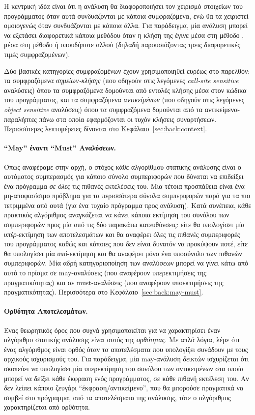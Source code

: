 Η κεντρική ιδέα είναι ότι η ανάλυση θα διαφοροποιήσει τον χειρισμό στοιχείων του προγράμματος όταν αυτά συνδυάζονται με κάποια συμφραζόμενα, ενώ θα τα χειριστεί ομοιογενώς όταν συνδυάζονται με κάποια άλλα. Για παράδειγμα, μία ανάλυση μπορεί να εξετάσει διαφορετικά κάποια μεθόδου όταν η κλήση της έγινε μέσα στη μέθοδο , μέσα στη μέθοδο  ή οπουδήποτε αλλού (δηλαδή παρουσιάζοντας τρεις διαφορετικές τιμές συμφραζομένων).

Δύο βασικές κατηγορίες συμφραζομένων έχουν χρησιμοποιηθεί ευρέως στο παρελθόν: τα συμφραζόμενα \emph{σημείων-κλήσης} (που οδηγούν στις λεγόμενες {\en \emph{call-site sensitive}} αναλύσεις) όπου τα συμφραζόμενα δομούνται από εντολές κλήσης μέσα στον κώδικα του προγράμματος, και τα συμφραζόμενα \emph{αντικείμένων} (που οδηγούν στις λεγόμενες {\en \emph{object sensitive}} αναλύσεις) όπου τα συμφραζόμενα δομούνται από τα αντικείμενα-παραλήπτες πάνω στα οποία εφαρμόζονται οι τυχόν κλήσεις συναρτήσεων. Περισσότερες λεπτομέρειες δίνονται στο Κεφάλαιο~\ref{sec:back:context}.


\paragraph*{``{\en May}'' έναντι ``{\en Must}'' Αναλύσεων.}
Όπως αναφέραμε στην αρχή, ο στόχος κάθε αλγορίθμου στατικής ανάλυσης είναι ο αυτόματος συμπερασμός για κάποιο σύνολο συμπεριφορών που δύναται να επιδείξει ένα πρόγραμμα \emph{σε όλες} τις πιθανές εκτελέσεις του. Μια τέτοια προσπάθεια είναι ένα μη-αποφασίσιμο πρόβλημα για τα περισσότερα σύνολα συμπεριφορών παρά για τα πιο τετριμμένα από αυτά (για ένα τυχαίο πρόγραμμα προς ανάλυση). Κατά συνέπεια, κάθε πρακτικός αλγόριθμος αναγκάζεται να κάνει κάποια εκτίμηση του συνόλου των συμπεριφορών προς μία από τις δύο παρακάτω κατευθύνσεις: είτε θα υπολογίσει μία \emph{υπέρ}-εκτίμηση των αποτελεσμάτων και θα αναφέρει όλες τις πιθανές συμπεριφορές του προγράμματος καθώς και κάποιες που δεν είναι δυνατόν να προκύψουν ποτέ, είτε θα υπολογίσει μία \emph{υπό}-εκτίμηση και θα αναφέρει μόνο ένα υποσύνολο των πιθανών συμπεριφορών. Μία αδρή κατηγοριοποίηση των αναλύσεων μπορεί να γίνει κάτω από αυτό το πρίσμα σε {\en may}-αναλύσεις (που αναφέρουν υπερεκτιμήσεις της πραγματικότητας) και σε {\en must}-αναλύσεις (που αναφέρουν υποεκτιμήσεις της πραγματικότητας). Περισσότερα στο Κεφάλαιο~\ref{sec:back:may-must}.


\paragraph*{Ορθότητα Αποτελεσμάτων.}
Ένας θεωρητικός όρος που συχνά χρησιμοποιείται για να χαρακτηρίσει έναν αλγόριθμο στατικής ανάλυσης είναι αυτός της \emph{ορθότητας}. Με απλά λόγια, λέμε ότι ένας αλγόριθμος είναι ορθός όταν τα αποτελέσματα που υπολογίζει συνάδουν με τους αρχικούς ισχυρισμούς του. Για παράδειγμα, μία {\en may}-ανάλυση δεικτών ισχυρίζεται ότι σκοπεύει να υπολογίσει μία υπερεκτίμηση του συνόλου των αντικειμένων στα οποία μπορεί να δείξει κάθε έκφραση ενός προγράμματος, σε κάθε πιθανή εκτέλεση του. Αν δεν λείπει κάποιο ζευγάρι ``έκφραση/αντικείμενο'', που θα μπορούσε πραγματικά να συμβεί στο πρόγραμμα, από τα αποτελέσματα της ανάλυσης, τότε ο αλγόριθμος χαρακτηρίζεται από ορθότητα.

